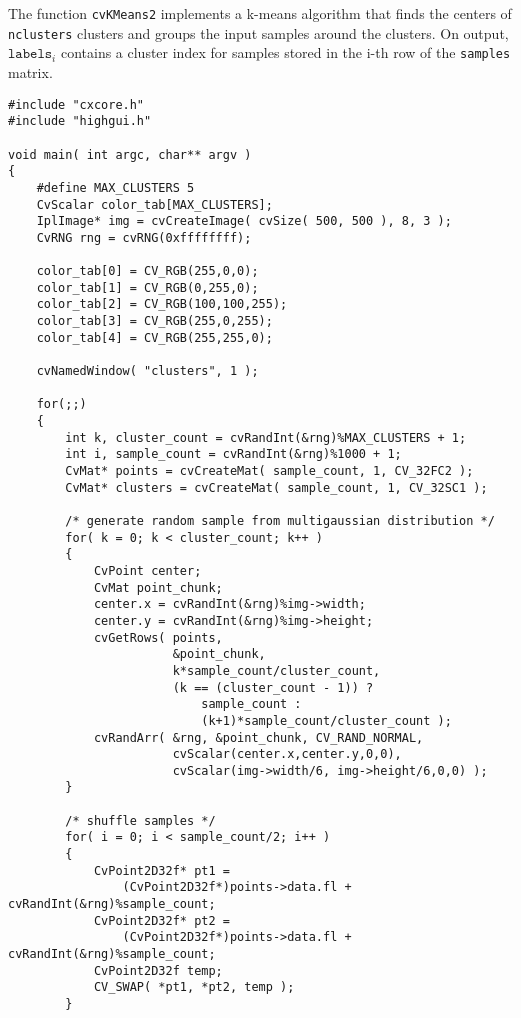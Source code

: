 The function \texttt{cvKMeans2} implements a k-means algorithm that finds the
centers of \texttt{nclusters} clusters and groups the input samples
around the clusters. On output, $\texttt{labels}_i$ contains a cluster index for
samples stored in the i-th row of the \texttt{samples} matrix.

\ifC
\begin{lstlisting}
#include "cxcore.h"
#include "highgui.h"

void main( int argc, char** argv )
{
    #define MAX_CLUSTERS 5
    CvScalar color_tab[MAX_CLUSTERS];
    IplImage* img = cvCreateImage( cvSize( 500, 500 ), 8, 3 );
    CvRNG rng = cvRNG(0xffffffff);

    color_tab[0] = CV_RGB(255,0,0);
    color_tab[1] = CV_RGB(0,255,0);
    color_tab[2] = CV_RGB(100,100,255);
    color_tab[3] = CV_RGB(255,0,255);
    color_tab[4] = CV_RGB(255,255,0);

    cvNamedWindow( "clusters", 1 );

    for(;;)
    {
        int k, cluster_count = cvRandInt(&rng)%MAX_CLUSTERS + 1;
        int i, sample_count = cvRandInt(&rng)%1000 + 1;
        CvMat* points = cvCreateMat( sample_count, 1, CV_32FC2 );
        CvMat* clusters = cvCreateMat( sample_count, 1, CV_32SC1 );

        /* generate random sample from multigaussian distribution */
        for( k = 0; k < cluster_count; k++ )
        {
            CvPoint center;
            CvMat point_chunk;
            center.x = cvRandInt(&rng)%img->width;
            center.y = cvRandInt(&rng)%img->height;
            cvGetRows( points,
                       &point_chunk,
                       k*sample_count/cluster_count,
                       (k == (cluster_count - 1)) ?
                           sample_count :
                           (k+1)*sample_count/cluster_count );
            cvRandArr( &rng, &point_chunk, CV_RAND_NORMAL,
                       cvScalar(center.x,center.y,0,0),
                       cvScalar(img->width/6, img->height/6,0,0) );
        }

        /* shuffle samples */
        for( i = 0; i < sample_count/2; i++ )
        {
            CvPoint2D32f* pt1 =
                (CvPoint2D32f*)points->data.fl + cvRandInt(&rng)%sample_count;
            CvPoint2D32f* pt2 =
                (CvPoint2D32f*)points->data.fl + cvRandInt(&rng)%sample_count;
            CvPoint2D32f temp;
            CV_SWAP( *pt1, *pt2, temp );
        }


\end{lstlisting}
